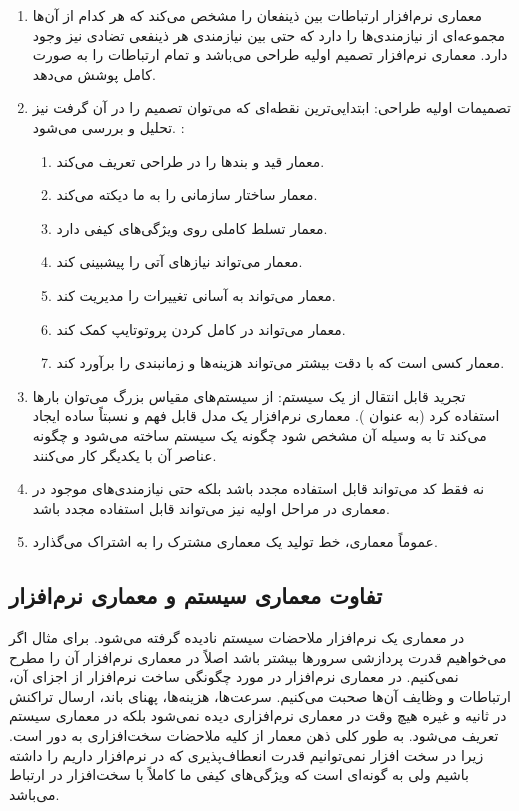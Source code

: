 \documentclass[a4paper]{article}
\begin{document}
\begin{enumerate}
    \item معماری نرم‌افزار ارتباطات بین ذینفعان را مشخص می‌کند که هر کدام از
    آن‌ها مجموعه‌ای از نیازمندی‌ها را دارد که حتی بین نیازمندی هر ذینفعی تضادی
    نیز وجود دارد. معماری نرم‌افزار تصمیم اولیه طراحی می‌باشد و تمام ارتباطات را
    به صورت کامل پوشش می‌دهد.
    \item تصمیمات اولیه طراحی: ابتدایی‌ترین نقطه‌ای که می‌توان تصمیم را در آن
    گرفت نیز تحلیل و بررسی می‌شود. :
    \begin{enumerate}
        \item معمار قید و بند‌ها را در طراحی تعریف می‌کند.
        \item معمار ساختار سازمانی را به ما دیکته می‌کند.
        \item معمار تسلط کاملی روی ویژگی‌های کیفی دارد.
        \item معمار می‌تواند نیاز‌های آتی را پیشبینی کند.
        \item معمار می‌تواند به آسانی تغییرات را مدیریت کند.
        \item معمار می‌تواند در کامل کردن پروتوتایپ کمک کند.
        \item معمار کسی است که با دقت بیشتر می‌تواند هزینه‌ها و زمانبندی را
        برآورد کند.
    \end{enumerate}
    \item تجرید قابل انتقال از یک سیستم: از سیستم‌های مقیاس بزرگ می‌توان بار‌ها
    استفاده کرد (به عنوان ). معماری نرم‌افزار یک مدل
    قابل فهم و نسبتاً ساده ایجاد می‌کند تا به وسیله آن مشخص شود چگونه یک سیستم
    ساخته می‌شود و چگونه عناصر آن با یکدیگر کار می‌کنند.
    \item نه فقط کد می‌تواند قابل استفاده مجدد باشد بلکه حتی نیازمندی‌های موجود
    در معماری در مراحل اولیه نیز می‌تواند قابل استفاده مجدد باشد.
    \item عموماً معماری، خط تولید یک معماری مشترک را به اشتراک می‌گذارد.
\end{enumerate}

\subsection{تفاوت معماری سیستم و معماری نرم‌افزار}

در معماری یک نرم‌افزار ملاحضات سیستم نادیده گرفته می‌شود. برای مثال اگر
می‌خواهیم قدرت پردازشی سرور‌ها بیشتر باشد اصلاً در معماری نرم‌افزار آن را مطرح
نمی‌کنیم. در معماری نرم‌افزار در مورد چگونگی ساخت نرم‌افزار از اجزای آن،
ارتباطات و وظایف آن‌ها صحبت می‌کنیم. سرعت‌ها، هزینه‌ها، پهنای باند، ارسال تراکنش
در ثانیه و غیره هیچ وقت در معماری نرم‌افزاری دیده نمی‌شود بلکه در معماری سیستم
تعریف می‌شود. به طور کلی ذهن معمار از کلیه ملاحضات سخت‌افزاری به دور است. زیرا
در سخت افزار نمی‌توانیم قدرت انعطاف‌پذیری که در نرم‌افزار داریم را داشته باشیم
ولی به گونه‌ای است که ویژگی‌های کیفی ما کاملاً با سخت‌افزار در ارتباط می‌باشد.
\end{document}

